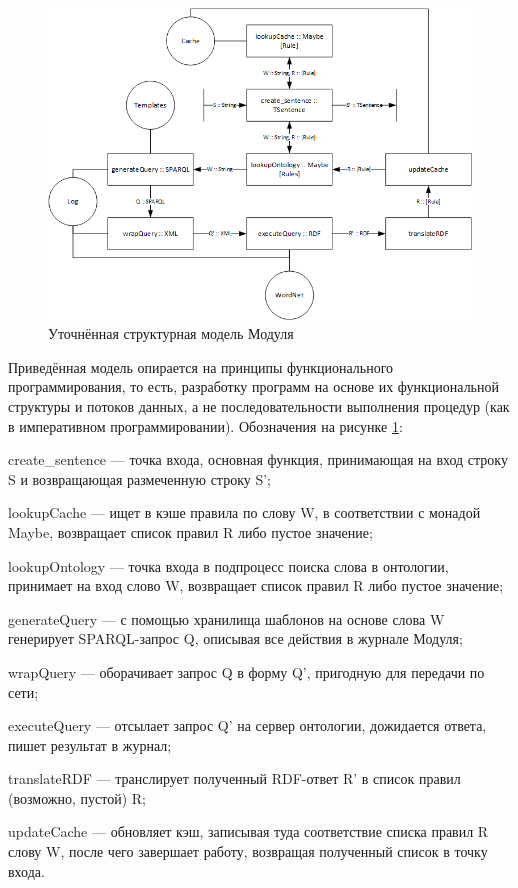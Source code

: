 \begin{figure}[H]
	\centering
		\includegraphics[scale=0.8]{images/typedstructure.png}
	\caption{\small Уточнённая структурная модель Модуля}
	\label{fig:typedstructure}
\end{figure} 

Приведённая модель опирается на принципы функционального программирования, то есть, разработку программ на основе их функциональной структуры и потоков данных, а не последовательности выполнения процедур (как в императивном программировании). Обозначения на рисунке \ref{fig:typedstructure}:

\begin{list}{}{\leftmargin=1.5cm}
	\item create_sentence --- точка входа, основная функция, принимающая на вход строку S и возвращающая размеченную строку S';
	\item lookupCache --- ищет в кэше правила по слову W, в соответствии с монадой Maybe, возвращает список правил R либо пустое значение;
	\item lookupOntology --- точка входа в подпроцесс поиска слова в онтологии, принимает на вход слово W, возвращает список правил R либо пустое значение;
	\item generateQuery --- с помощью хранилища шаблонов на основе слова W генерирует SPARQL-запрос Q, описывая все действия в журнале Модуля;
	\item wrapQuery --- оборачивает запрос Q в форму Q', пригодную для передачи по сети;
	\item executeQuery --- отсылает запрос Q' на сервер онтологии, дожидается ответа, пишет результат в журнал;
	\item translateRDF --- транслирует полученный RDF-ответ R' в список правил (возможно, пустой) R;
	\item updateCache --- обновляет кэш, записывая туда соответствие списка правил R слову W, после чего завершает работу, возвращая полученный список в точку входа.
\end{list}

